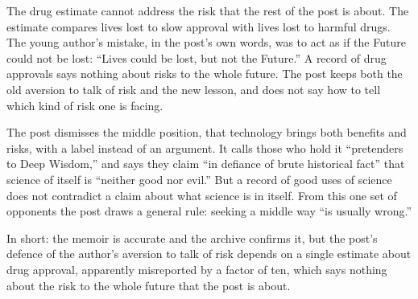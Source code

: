 \begin{afterword}
The drug estimate cannot address the risk that the rest of the post is about. The estimate compares lives lost to slow approval with lives lost to harmful drugs. The young author's mistake, in the post's own words, was to act as if the Future could not be lost: ``Lives could be lost, but not the Future.'' A record of drug approvals says nothing about risks to the whole future. The post keeps both the old aversion to talk of risk and the new lesson, and does not say how to tell which kind of risk one is facing.

The post dismisses the middle position, that technology brings both benefits and risks, with a label instead of an argument. It calls those who hold it ``pretenders to Deep Wisdom,'' and says they claim ``in defiance of brute historical fact'' that science of itself is ``neither good nor evil.'' But a record of good uses of science does not contradict a claim about what science is in itself. From this one set of opponents the post draws a general rule: seeking a middle way ``is usually wrong.''

In short: the memoir is accurate and the archive confirms it, but the post's defence of the author's aversion to talk of risk depends on a single estimate about drug approval, apparently misreported by a factor of ten, which says nothing about the risk to the whole future that the post is about.
\end{afterword}
